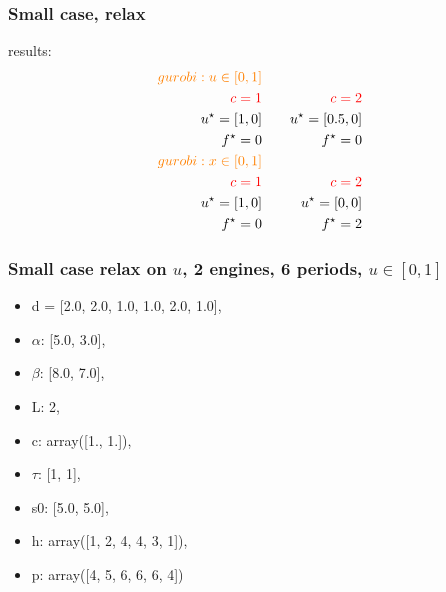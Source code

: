 \begin{frame}
  \frametitle{Small case, relax}
  results:
  \begin{align*}
    \textcolor{orange}{gurobi:  u \in [0, 1]    }          \\
    \textcolor{red}{c = 1} &       & \textcolor{red}{c =2} \\
    u^\star = [1, 0]       & \quad & u^\star = [0.5, 0]    \\
    f^\star = 0            &       & f^\star = 0           \\
    \textcolor{orange}{gurobi:    x \in [0, 1]      }      \\
    \textcolor{red}{c = 1} &       & \textcolor{red}{c =2} \\
    u^\star = [1, 0]       & \quad & u^\star = [0, 0]      \\
    f^\star = 0            &       & f^\star = 2           \\
  \end{align*}
\end{frame}

\begin{frame}
  \frametitle{Small case relax on \(u\), 2 engines, 6 periods,  \(u \in [0, 1]\)}
  \begin{itemize}
    \item d = [2.0, 2.0, 1.0, 1.0, 2.0, 1.0],
    \item \(\alpha\): [5.0, 3.0],
    \item \(\beta\): [8.0, 7.0],
    \item L: 2,
    \item c: array([1., 1.]),
    \item \(\tau\): [1, 1],
    \item s0: [5.0, 5.0],
    \item h: array([1, 2, 4, 4, 3, 1]),
    \item p: array([4, 5, 6, 6, 6, 4])
  \end{itemize}
\end{frame}


